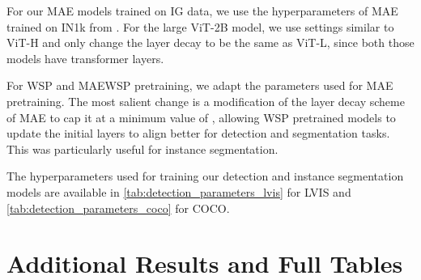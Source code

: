 \documentclass[10pt,twocolumn,letterpaper]{article}
\newcommand{\mae}{MAE\xspace}
\newcommand{\ce}{WSP\xspace}
\newcommand{\ours}{MAEWSP\xspace}  \newcommand{\oursig}{\ours{}\textsubscript{IG}\xspace}
\newcommand{\vitL}{ViT-L\xspace}
\newcommand{\vitH}{ViT-H\xspace}
\newcommand{\vitTwoB}{ViT-2B\xspace}
\newcommand{\igShort}{IG\xspace}
\newcommand{\inetOneKShort}{IN1k\xspace}
\newcommand{\cocoShort}{COCO\xspace}
\newcommand{\lvisShort}{LVIS\xspace}
\begin{document}
For our \mae models trained on \igShort data, we use the hyperparameters of \mae trained on \inetOneKShort from \cite{li2022vitdet}.
For the large \vitTwoB model, we use settings similar to \vitH and only change the layer decay to be the same as \vitL,
since both those models have  transformer layers.

For \ce and \ours pretraining, we adapt the parameters used for \mae pretraining.
The most salient change is a modification of the layer decay scheme of \mae to cap it at a minimum value of ,
allowing \ce pretrained models to update the initial layers to align better for detection and segmentation tasks.
This was particularly useful for instance segmentation.

The hyperparameters used for training our detection and instance segmentation models are available
in \cref{tab:detection_parameters_lvis} for \lvisShort and \cref{tab:detection_parameters_coco} for \cocoShort.


\section{Additional Results and Full Tables}
\end{document}
